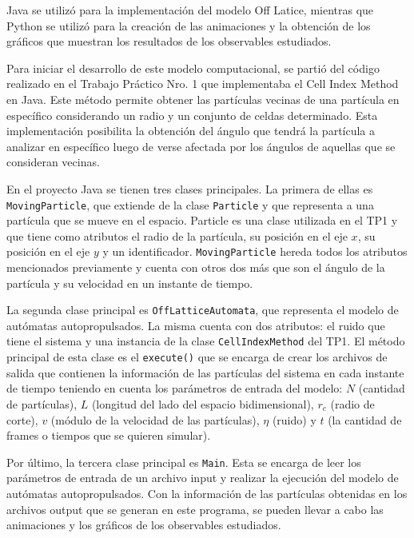 \documentclass[11pt]{article}
\begin{document}
    Java se utilizó para la implementación del modelo Off Latice, mientras que Python se utilizó para la creación de las
    animaciones y la obtención de los gráficos que muestran los resultados de los observables estudiados.

    Para iniciar el desarrollo de este modelo computacional, se partió del código realizado en el Trabajo Práctico Nro. 1 que
    implementaba el Cell Index Method en Java. Este método permite obtener las partículas vecinas de una partícula en específico
    considerando un radio y un conjunto de celdas determinado. Esta implementación posibilita la obtención del ángulo que tendrá
    la partícula a analizar en específico luego de verse afectada por los ángulos de aquellas que se consideran vecinas.

    En el proyecto Java se tienen tres clases principales. La primera de ellas es \texttt{MovingParticle}, que extiende de
    la clase \texttt{Particle} y que representa a una partícula que se mueve en el espacio. Particle es una clase utilizada en el
    TP1 y que tiene como atributos el radio de la partícula, su posición en el eje $x$, su posición en el eje $y$ y un
    identificador. \texttt{MovingParticle} hereda todos los atributos mencionados previamente y cuenta con otros dos más que son
    el ángulo de la partícula y su velocidad en un instante de tiempo.

    La segunda clase principal es \texttt{OffLatticeAutomata}, que representa el modelo de autómatas autopropulsados. La misma cuenta
    con dos atributos: el ruido que tiene el sistema y una instancia de la clase \texttt{CellIndexMethod} del TP1. El método principal de esta clase
    es el \texttt{execute()} que se encarga de crear los archivos de salida que contienen la información de las partículas del sistema
    en cada instante de tiempo teniendo en cuenta los parámetros de entrada del modelo: $N$ (cantidad de partículas), $L$ (longitud
    del lado del espacio bidimensional), $r_c$ (radio de corte), $v$ (módulo de la velocidad de las partículas), $\eta$ (ruido) y
    $t$ (la cantidad de frames o tiempos que se quieren simular).

    Por último, la tercera clase principal es \texttt{Main}. Esta se encarga de leer los parámetros de entrada de un archivo input y
    realizar la ejecución del modelo de autómatas autopropulsados. Con la información de las partículas obtenidas en los archivos
    output que se generan en este programa, se pueden llevar a cabo las animaciones y los gráficos de los observables estudiados.
\end{document}
